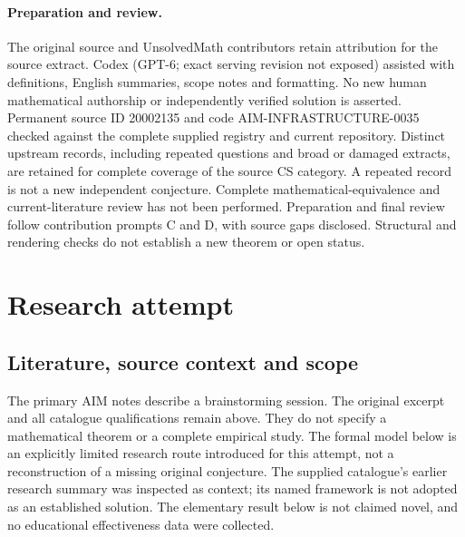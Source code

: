 \documentclass[11pt]{article}
\begin{document}
\paragraph{Preparation and review.}
The original source and UnsolvedMath contributors retain attribution for the source extract. Codex (GPT-6; exact serving revision not exposed) assisted with definitions, English summaries, scope notes and formatting. No new human mathematical authorship or independently verified solution is asserted. Permanent source ID 20002135 and code AIM-INFRASTRUCTURE-0035 checked against the complete supplied registry and current repository. Distinct upstream records, including repeated questions and broad or damaged extracts, are retained for complete coverage of the source CS category. A repeated record is not a new independent conjecture. Complete mathematical-equivalence and current-literature review has not been performed. Preparation and final review follow contribution prompts C and D, with source gaps disclosed. Structural and rendering checks do not establish a new theorem or open status.
\label{end:20002135}

\section{Research attempt}
\subsection{Literature, source context and scope}
The primary AIM notes describe a brainstorming session. The original excerpt and all catalogue qualifications remain above. They do not specify a mathematical theorem or a complete empirical study. The formal model below is an explicitly limited research route introduced for this attempt, not a reconstruction of a missing original conjecture. The supplied catalogue's earlier research summary was inspected as context; its named framework is not adopted as an established solution. The elementary result below is not claimed novel, and no educational effectiveness data were collected.
\end{document}
